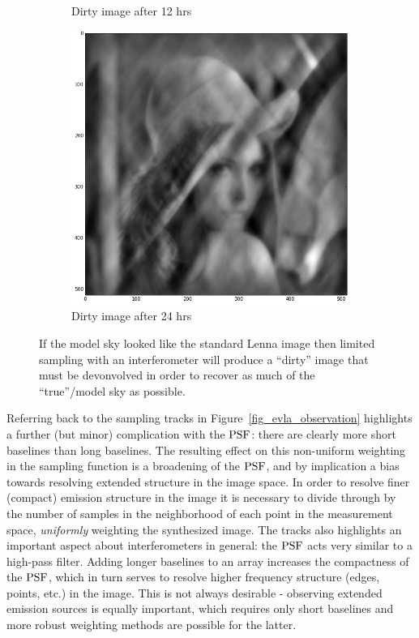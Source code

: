 \begin{figure}[ht!]
\begin{mdframed}
\begin{subfigure}[b]{0.34\textwidth}
  \caption{Dirty image after 12 hrs}
 \end{subfigure}
 \begin{subfigure}[b]{0.34\textwidth}
  \includegraphics[width=\textwidth]{images/evla_lena_observation/24hr.png}
  \caption{Dirty image after 24 hrs}
 \end{subfigure}
 \caption[Effect of observation time on dirty image synthesis]{If the model sky looked like the standard Lenna image then limited sampling with an interferometer will produce a ``dirty'' image that
 must be devonvolved in order to recover as much of the ``true''/model sky as possible.}
  \label{fig_model_convolution}
 \end{mdframed}
\end{figure}

Referring back to the sampling tracks in Figure~\ref{fig_evla_observation} highlights a further (but minor) complication with the $\textrm{PSF}$: there are clearly more short baselines than long baselines. The resulting effect on this non-uniform
weighting in the sampling function is a broadening of the $\textrm{PSF}$, and by implication a bias towards resolving extended structure in the image space. In order to resolve finer (compact) emission structure in the image
it is necessary to divide through by the number of samples in the neighborhood of each point in the measurement space, \emph{uniformly} weighting the synthesized image. The tracks also highlights an important aspect about
interferometers in general: the $\textrm{PSF}$ acts very similar to a high-pass filter. Adding longer baselines to an array increases the compactness of the $\textrm{PSF}$, which in turn serves to resolve higher frequency structure (edges, points, etc.)
in the image. This is not always desirable - observing extended emission sources is equally important, which requires only short baselines and more robust weighting methods are possible for the latter.


